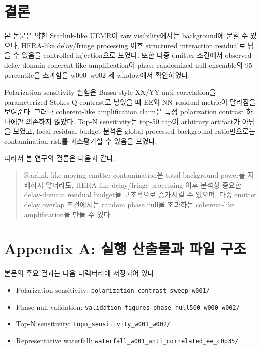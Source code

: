 \documentclass[11pt,a4paper]{article}
\begin{document}
\section{결론}

본 논문은 약한 Starlink-like UEMR이 raw visibility에서는 background에 묻힐 수 있으나, HERA-like delay/fringe processing 이후 structured interaction residual로 남을 수 있음을 controlled injection으로 보였다.
또한 다중 emitter 조건에서 observed delay-domain coherent-like amplification이 phase-randomized null ensemble의 95 percentile을 초과함을 w000--w002 세 window에서 확인하였다.

Polarization sensitivity 실험은 Bassa-style XX/YY anti-correlation을 parameterized Stokes-Q contrast로 넣었을 때 EE와 NN residual metric이 달라짐을 보여준다.
그러나 coherent-like amplification claim은 특정 polarization contrast 하나에만 의존하지 않았다.
Top-N sensitivity는 top-50 cap이 arbitrary artifact가 아님을 보였고, local residual budget 분석은 global processed-background ratio만으로는 contamination risk를 과소평가할 수 있음을 보였다.

따라서 본 연구의 결론은 다음과 같다.
\begin{quote}
Starlink-like moving-emitter contamination은 total background power를 지배하지 않더라도, HERA-like delay/fringe processing 이후 분석상 중요한 delay-domain residual budget을 구조적으로 증가시킬 수 있으며, 다중 emitter delay overlap 조건에서는 random phase null을 초과하는 coherent-like amplification을 만들 수 있다.
\end{quote}

\appendix

\section{Appendix A: 실행 산출물과 파일 구조}

본문의 주요 결과는 다음 디렉터리에 저장되어 있다.
\begin{itemize}
  \item Polarization sensitivity: \texttt{polarization\_contrast\_sweep\_w001/}
  \item Phase null validation: \texttt{validation\_figures\_phase\_null500\_w000\_w002/}
  \item Top-N sensitivity: \texttt{topn\_sensitivity\_w001\_w002/}
  \item Representative waterfall: \texttt{waterfall\_w001\_anti\_correlated\_ee\_c0p35/}
\end{itemize}
\end{document}
